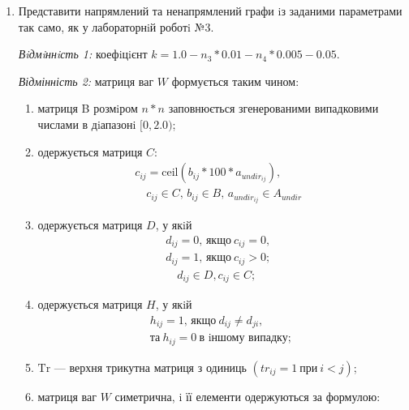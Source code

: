 
\def\basedir{/home/theammir/labs/asd/lab2.6/res}


\usepackage{graphicx}
\usepackage[hypcap=false]{caption}
\usepackage{framed}
\usepackage{amsmath}


\def\thelabid{lab2.6}

\taskdesc%
\begin{enumerate}
  \item Представити напрямлений та ненапрямлений графи iз заданими параметрами так само, як у лабораторнiй роботi №3.\par
    \emph{Вiдмiннiсть 1:} коефiцiєнт $k = 1.0 - n_3 * 0.01 - n_4 * 0.005 - 0.05$.\par
    \emph{Відмінність 2:} матриця ваг $W$ формується таким чином:
    \begin{enumerate}
      \item матриця B розмiром $n*n$ заповнюється згенерованими випадковими числами в дiапазонi $[0, 2.0)$;
      \item одержується матриця $C$:
        \begin{align*}
          c_{ij} = \text{ceil} (b_{ij} * 100 * a_{undir_{ij}}),& \\
          \quad c_{ij} \in C,\, b_{ij} \in B,\, a_{undir_{ij}} \in A_{undir}
        \end{align*}
      \item одержується матриця $D$, у якiй
        \begin{align*}
          d_{ij} = 0,\, \text{якщо}\ c_{ij} = 0,& \\
          d_{ij} = 1,\, \text{якщо}\ c_{ij} > 0;& \\
          \quad d_{ij} \in D, c_{ij} \in C;
        \end{align*}
      \item одержується матриця $H$, у якiй
        \begin{align*}
          h_{ij} = 1,\, \text{якщо}\ d_{ij} \ne d_{ji},\,\\
          \text{та}\ h_{ij} = 0\ \text{в iншому випадку};\;
        \end{align*}
      \item $\text{Tr}$ --- верхня трикутна матриця з одиниць $(tr_{ij} = 1\ \text{при}\ i < j)$;
      \item матриця ваг $W$ симетрична, i її елементи одержуються за формулою:

\end{enumerate}
\end{enumerate}
